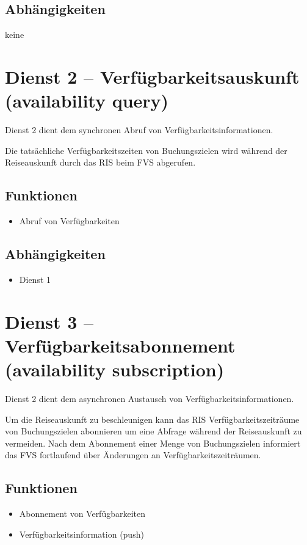 \subsection*{Abhängigkeiten}
keine 

\section{Dienst 2 -- Verfügbarkeitsauskunft (availability query) }
Dienst 2 dient dem synchronen Abruf von Verfügbarkeitsinformationen.

Die tatsächliche Verfügbarkeitszeiten von Buchungszielen wird während der Reiseauskunft durch das RIS beim FVS abgerufen. 

\subsection*{Funktionen}
\begin{itemize}
\item Abruf von Verfügbarkeiten
\end{itemize}

\subsection*{Abhängigkeiten}
\begin{itemize}
\item Dienst 1
\end{itemize}

\section{Dienst 3 -- Verfügbarkeitsabonnement (availability subscription) }
Dienst 2 dient dem asynchronen Austausch von Verfügbarkeitsinformationen.

Um die Reiseauskunft zu beschleunigen kann das RIS Verfügbarkeitszeiträume von Buchungszielen abonnieren um eine Abfrage während der Reiseauskunft zu vermeiden. Nach dem Abonnement einer Menge von Buchungszielen informiert das FVS fortlaufend über Änderungen an Verfügbarkeitszeiträumen.

\subsection*{Funktionen}
\begin{itemize}
\item Abonnement von Verfügbarkeiten
\item Verfügbarkeitsinformation (push)
\end{itemize}

